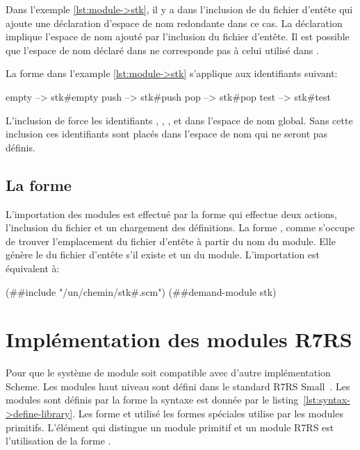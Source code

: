 Dans l'exemple \ref{lst:module->stk}, il y a dans  l'inclusion
de du fichier d'entête  qui ajoute une déclaration d'espace
de nom redondante dans ce cas.  La déclaration 
implique l'espace de nom ajouté par l'inclusion du fichier d'entête. Il est
possible que l'espace de nom déclaré dans  ne corresponde
pas à celui utilisé dans .

La forme  dans l'example \ref{lst:module->stk}
s'applique aux identifiants suivant:
\begin{center}
  \begin{mplisting}{0.3}
empty --> stk#empty
push  --> stk#push
pop   --> stk#pop
test  --> stk#test
\end{mplisting}
\end{center}
L'inclusion de  force les identifiants
, , ,  et
 dans l'espace de nom global. Sans cette inclusion
ces identifiants sont placés dans l'espace de nom  qui
ne seront pas définis.

\subsection{La forme }
%
L'importation des modules est effectué par la forme  qui
effectue deux actions, l'inclusion du fichier  et un
chargement des définitions.  La forme , comme
 s'occupe de trouver l'emplacement du fichier d'entête
à partir du nom du module. Elle génère le  du fichier
d'entête s'il existe et un  du module.  L'importation
 est équivalent à:

\begin{center}
  \begin{mplisting}{0.9}
(##include "/un/chemin/stk#.scm")
(##demand-module stk)
\end{mplisting}
\end{center}


\section{Implémentation des modules R7RS}
Pour que le système de module soit compatible avec d'autre implémentation
Scheme.  Les modules haut niveau sont défini dans le standard R7RS
Small~\cite{Scheme:R7RS}. Les modules sont définis par la forme
 la syntaxe est donnée par le
listing~\ref{lst:syntax->define-library}. Les forme  et
 utilisé les formes spéciales utilise par les modules
primitifs. L'élément qui distingue un module primitif et un module R7RS
est l'utilisation de la forme .

